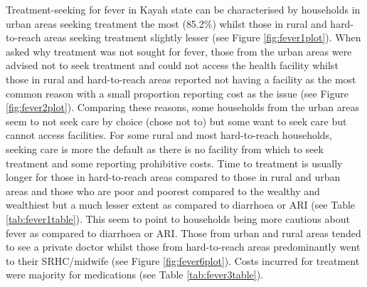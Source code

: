 \documentclass[12pt,a4paper]{article}
\begin{document}
Treatment-seeking for fever in Kayah state can be characterised by households in urban areas seeking treatment the most (85.2\%) whilst those in rural and hard-to-reach areas seeking treatment slightly lesser (see Figure \ref{fig:fever1plot}). When asked why treatment was not sought for fever, those from the urban areas were advised not to seek treatment and could not access the health facility whilst those in rural and hard-to-reach areas reported not having a facility as the most common reason with a small proportion reporting cost as the issue (see Figure \ref{fig:fever2plot}). Comparing these reasons, some households from the urban areas seem to not seek care by choice (chose not to) but some want to seek care but cannot access facilities. For some rural and most hard-to-reach households, seeking care is more the default as there is no facility from which to seek treatment and some reporting prohibitive costs. Time to treatment is usually longer for those in hard-to-reach areas compared to those in rural and urban areas and those who are poor and poorest compared to the wealthy and wealthiest but a much lesser extent as compared to diarrhoea or ARI (see Table \ref{tab:fever1table}). This seem to point to households being more cautious about fever as compared to diarrhoea or ARI. Those from urban and rural areas tended to see a private doctor whilst those from hard-to-reach areas predominantly went to their SRHC/midwife (see Figure \ref{fig:fever6plot}). Costs incurred for treatment were majority for medications (see Table \ref{tab:fever3table}).
\end{document}
